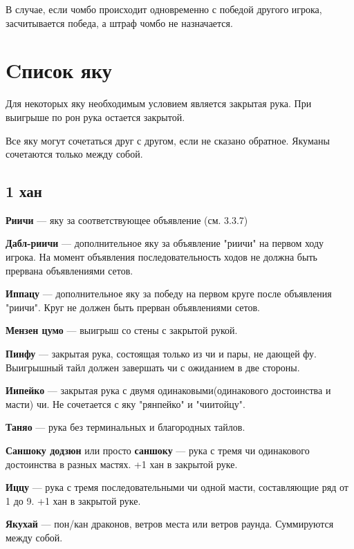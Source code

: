 В случае, если чомбо происходит одновременно с победой другого игрока, засчитывается победа, а штраф чомбо не назначается.





\section{Cписок яку}

Для некоторых яку необходимым условием является закрытая рука. При выигрыше по рон рука остается закрытой. 

Все яку могут сочетаться друг с другом, если не сказано обратное. Якуманы сочетаются только между собой. 


\subsection{1 хан}

\textbf{Риичи} --- яку за соответствующее объявление (см. 3.3.7)

\textbf{Дабл-риичи} --- дополнительное яку за объявление "риичи" на первом ходу игрока. На момент объявления  последовательность ходов не должна быть прервана объявлениями сетов.

\textbf{Иппацу} --- дополнительное яку за победу на первом круге после объявления "риичи". Круг не должен быть прерван объявлениями сетов. 

\textbf{Мензен цумо} --- выигрыш со стены с закрытой рукой.

\textbf{Пинфу} --- закрытая рука,  состоящая только из чи и пары, не дающей фу. Выигрышный тайл должен завершать чи с ожиданием в две стороны.

\textbf{Иипейко} --- закрытая рука с двумя одинаковыми(одинакового достоинства и масти) чи. Не сочетается с яку "рянпейко" и "чиитойцу".


\textbf{Таняо} --- рука без терминальных и благородных тайлов.

\textbf{Саншоку додзюн} или просто \textbf{саншоку} --- рука с тремя чи одинакового достоинства в разных мастях. +1 хан в закрытой руке.


\textbf{Иццу} --- рука с тремя последовательными чи одной масти, составляющие ряд от 1 до 9. +1 хан в закрытой руке.


\textbf{Якухай} ---  пон/кан драконов, ветров места или ветров раунда. Суммируются между собой.

